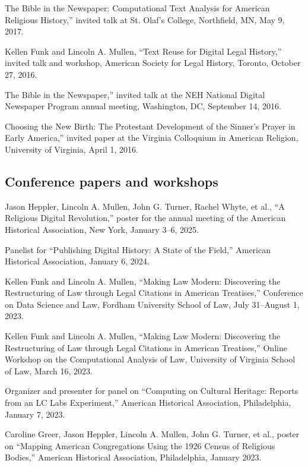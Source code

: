 \documentclass[11pt]{article}
\begin{document}
\noindent{}The Bible in the Newspaper: Computational Text Analysis for American Religious History,'' invited talk at St. Olaf's College, Northfield, MN, May 9, 2017.

Kellen Funk and Lincoln A. Mullen, ``Text Reuse for Digital Legal History,'' invited talk and workshop, American Society for Legal History, Toronto, October 27, 2016.

\noindent{}The Bible in the Newspaper,'' invited talk at the NEH National Digital Newspaper Program annual meeting, Washington, DC, September 14, 2016.

\noindent{}Choosing the New Birth: The Protestant Development of the Sinner's Prayer in Early America,'' invited paper at the Virginia Colloquium in American Religion, University of Virginia, April 1, 2016.

\subsection{Conference papers and workshops}\label{Conference papers}


Jason Heppler, Lincoln A. Mullen, John G. Turner, Rachel Whyte, et al., ``A Religious Digital Revolution,'' poster for the annual meeting of the American Historical Association, New York, January 3--6, 2025.

Panelist for ``Publishing Digital History: A State of the Field,'' American Historical Association, January 6, 2024.

Kellen Funk and Lincoln A. Mullen, ``Making Law Modern: Discovering the Restructuring of Law through Legal Citations in American Treatises,'' Conference on Data Science and Law, Fordham University School of Law, July 31--August 1, 2023.  

Kellen Funk and Lincoln A. Mullen, ``Making Law Modern: Discovering the Restructuring of Law through Legal Citations in American Treatises,'' Online Workshop on the Computational Analysis of Law, University of Virginia School of Law, March 16, 2023.  

Organizer and presenter for panel on ``Computing on Cultural Heritage: Reports from an LC Labs Experiment,'' American Historical Association, Philadelphia, January 7, 2023.

Caroline Greer, Jason Heppler, Lincoln A. Mullen, John G. Turner, et al., poster on ``Mapping American Congregations Using the 1926 Census of Religious Bodies,'' American Historical Association, Philadelphia, January 2023.
\end{document}

